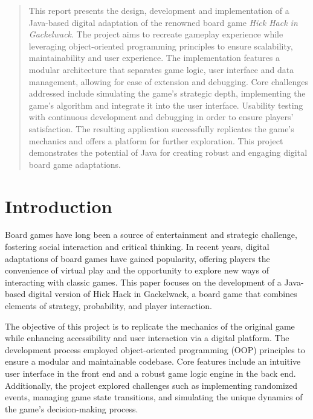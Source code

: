 \documentclass[conference]{IEEEtran}
\begin{document}
\begin{abstract}
This report presents the design, development and implementation of a Java-based digital adaptation of the renowned board game \textit{Hick Hack in Gackelwack}. The project aims to recreate gameplay experience while leveraging object-oriented programming principles to ensure scalability, maintainability and user experience. The implementation features a modular architecture that separates game logic, user interface and data management, allowing for ease of extension and debugging. Core challenges addressed include simulating the game's strategic depth, implementing the game's algorithm and integrate it into the user interface. Usability testing with continuous development and debugging in order to ensure players' satisfaction. The resulting application successfully replicates the game's mechanics and offers a platform for further exploration. This project demonstrates the potential of Java for creating robust and engaging digital board game adaptations.
\end{abstract}


\section{Introduction}

Board games have long been a source of entertainment and strategic challenge, fostering social interaction and critical thinking. In recent years, digital adaptations of board games have gained popularity, offering players the convenience of virtual play and the opportunity to explore new ways of interacting with classic games. This paper focuses on the development of a Java-based digital version of Hick Hack in Gackelwack, a board game that combines elements of strategy, probability, and player interaction.

The objective of this project is to replicate the mechanics of the original game while enhancing accessibility and user interaction via a digital platform. The development process employed object-oriented programming (OOP) principles to ensure a modular and maintainable codebase. Core features include an intuitive user interface in the front end and a robust game logic engine in the back end. Additionally, the project explored challenges such as implementing randomized events, managing game state transitions, and simulating the unique dynamics of the game's decision-making process.
\end{document}
